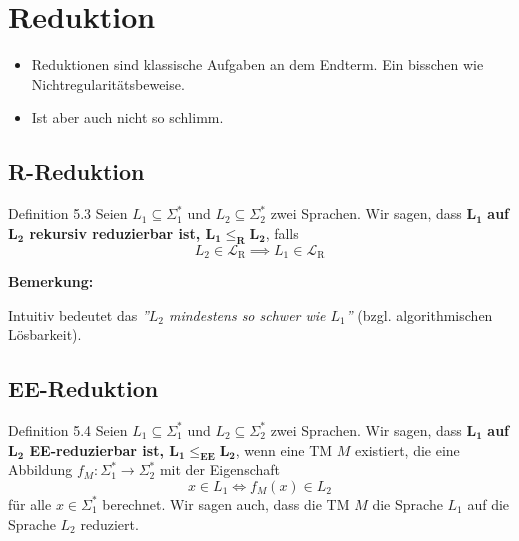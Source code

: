 \documentclass[a4paper, 11pt]{article}
\def\Lr{\mathcal{L}_\text{R}}
\begin{document}
            
            
            
            
            \section{Reduktion}
            
                \begin{itemize}
                    \item Reduktionen sind klassische Aufgaben an dem Endterm. Ein bisschen wie Nichtregularitätsbeweise.
                    \item Ist aber auch nicht so schlimm.
                \end{itemize}
            
            
            
                \subsection{R-Reduktion}
                \begin{mainbox}{Definition 5.3}
                    Seien $L_1 \subseteq \Sigma_{1}^*$ und $L_2 \subseteq \Sigma_{2}^*$ zwei Sprachen. Wir sagen, dass $\mathbf{L_1}$ \textbf{auf $\mathbf{L_2}$ rekursiv reduzierbar ist, $\mathbf{L_1 \leq_{\textbf{R}} L_2}$}, falls
                    $$L_2 \in \Lr \implies L_1 \in \Lr$$
                \end{mainbox}
                \textbf{Bemerkung:}
            
                Intuitiv bedeutet das \textit{''$L_2$ mindestens so schwer wie $L_1$''} (bzgl. algorithmischen Lösbarkeit).
            
            
            
                \subsection{EE-Reduktion}
                \begin{mainbox}{Definition 5.4}
                    Seien $L_1 \subseteq \Sigma_{1}^*$ und $L_2 \subseteq \Sigma_{2}^*$ zwei Sprachen. 
                    Wir sagen, dass $\mathbf{L_1}$ \textbf{auf $\mathbf{L_2}$ EE-reduzierbar ist, $\mathbf{L_1 \leq_{\textbf{EE}} L_2}$}, wenn eine TM $M$ existiert, 
                    die eine Abbildung $f_M: \Sigma_1^* \to \Sigma_2^*$ mit der Eigenschaft
                    $$x \in L_1 \iff f_M(x) \in L_2$$
                    für alle $x \in \Sigma_1^*$ berechnet. Wir sagen auch, dass die TM $M$ die Sprache $L_1$ auf die Sprache $L_2$ reduziert.
                \end{mainbox}
                
\end{document}
